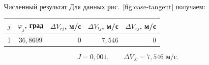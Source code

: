 \begin{explanation}{Численный результат}
Для данных рис.~\ref{fig:case-tangent} получаем:
\begin{center}\begin{tabular}{cc|rrr}
$j$ & $\varphi_j$, град & $\Delta V_{rj}$, м/с & $\Delta V_{tj}$, м/с & $\Delta V_{zj}$, м/с\\\hline
1 & $36{,}8699$ & $0$ & $7{,}546$ & $0$\\
\end{tabular}\end{center}
\[ J=0{,}001,\qquad \Delta V_\Sigma=7{,}546\text{ м/с}.\]
\end{explanation}
